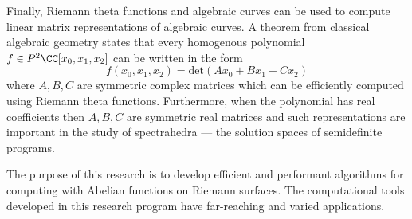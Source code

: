 Finally, Riemann theta functions and algebraic curves can be used to
compute linear matrix representations of algebraic curves. A theorem
from classical algebraic geometry states that every homogenous
polynomial $f \in P^2\CC[x_0,x_1,x_2]$ can be written in the form
\[
   f(x_0,x_1,x_2) = \text{det}
   \left( A x_0 + B x_1 + C x_2 \right)
\]
where $A,B,C$ are symmetric complex matrices which can be efficiently
computed using Riemann theta functions. Furthermore, when the polynomial
has real coefficients then $A,B,C$ are symmetric real matrices and such
representations are important in the study of spectrahedra --- the
solution spaces of semidefinite programs. \cite{PSV10}

The purpose of this research is to develop efficient and performant
algorithms for computing with Abelian functions on Riemann surfaces. The
computational tools developed in this research program have far-reaching
and varied applications.

